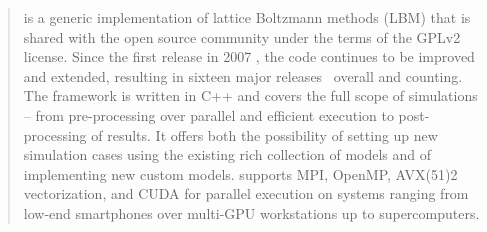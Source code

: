 \begin{abstract}
\OpenLB is a generic implementation of lattice Boltzmann methods (LBM) that is shared with the open source community under the terms of the GPLv2 license.
Since the first release in 2007 \cite{olb03}, the code continues to be improved and extended, resulting in sixteen major releases~\cite{olb18,olb17,olb16,olb15,olb14,olb13,olb12,olb11,olb10,olb09,olb08,olb07,olb06,olb05,olb04,olb03} overall and counting.
The \OpenLB framework is written in C++ and covers the full scope of simulations -- from pre-processing over parallel and efficient execution to post-processing of results.
It offers both the possibility of setting up new simulation cases using the existing rich collection of models and of implementing new custom models.
\OpenLB supports MPI, OpenMP, AVX(51)2 vectorization, and CUDA for parallel execution on systems ranging from low-end smartphones over multi-GPU workstations up to supercomputers.
\end{abstract}